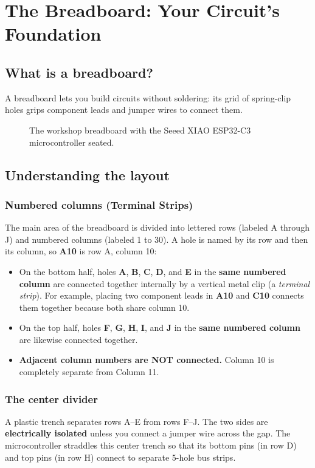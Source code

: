 \section{The Breadboard: Your Circuit's Foundation}

\subsection{What is a breadboard?}
A breadboard lets you build circuits without soldering: its grid of spring-clip holes grips
component leads and jumper wires to connect them.

\begin{figure}[t]
    \centering
    \caption{The workshop breadboard with the Seeed XIAO ESP32-C3 microcontroller seated.}
    \label{fig:breadboard_overview}
\end{figure}

\subsection{Understanding the layout}

\subsubsection{Numbered columns (Terminal Strips)}
The main area of the breadboard is divided into lettered rows (labeled A through J) and numbered
columns (labeled 1 to 30). A hole is named by its row and then its column, so \textbf{A10} is
row A, column 10:
\begin{itemize}
    \item On the bottom half, holes \textbf{A}, \textbf{B}, \textbf{C}, \textbf{D}, and \textbf{E} in the
    \textbf{same numbered column} are connected together internally by a vertical metal clip (a \textit{terminal strip}).
    For example, placing two component leads in \textbf{A10} and \textbf{C10} connects them together because both
    share column 10.
    \item On the top half, holes \textbf{F}, \textbf{G}, \textbf{H}, \textbf{I}, and \textbf{J} in the
    \textbf{same numbered column} are likewise connected together.
    \item \textbf{Adjacent column numbers are NOT connected.} Column 10 is completely separate from Column 11.
\end{itemize}

\subsubsection{The center divider}
A plastic trench separates rows A--E from rows F--J. The two sides are \textbf{electrically isolated}
unless you connect a jumper wire across the gap. The microcontroller straddles this center trench so that
its bottom pins (in row D) and top pins (in row H) connect to separate 5-hole bus strips.


